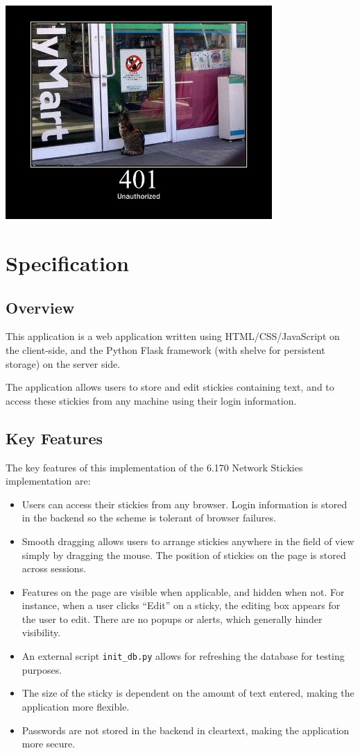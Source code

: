 \documentclass[11pt,letterpaper]{article}
\begin{document}
\begin{center}
\includegraphics[width=4in]{dot/401.jpg}
\label{fig:401} 
\end{center}

\section{Specification}
\subsection{Overview}
This application is a web application written using HTML/CSS/JavaScript on the client-side, and the Python Flask framework (with shelve for persistent storage) on the server side.

The application allows users to store and edit stickies containing text, and to access these stickies from any machine using their login information.

\subsection{Key Features}
The key features of this implementation of the 6.170 Network Stickies implementation are:
\begin{itemize}
\item Users can access their stickies from any browser. Login information is stored in the backend so the scheme is tolerant of browser failures.
\item Smooth dragging allows users to arrange stickies anywhere in the field of view simply by dragging the mouse. The position of stickies on the page is stored across sessions.
\item Features on the page are visible when applicable, and hidden when not. For instance, when a user clicks ``Edit'' on a sticky, the editing box appears for the user to edit. There are no popups or alerts, which generally hinder visibility.
\item An external script \texttt{init\_db.py} allows for refreshing the database for testing purposes.
\item The size of the sticky is dependent on the amount of text entered, making the application more flexible.
\item Passwords are not stored in the backend in cleartext, making the application more secure.
\end{itemize}
\end{document}
